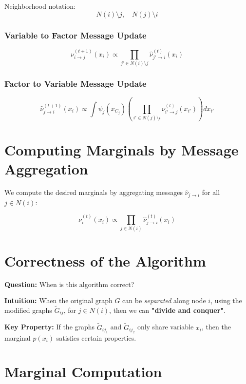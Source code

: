 \documentclass{article}%
\begin{document}
Neighborhood notation:
\[
N(i) \setminus j, \quad N(j) \setminus i
\]

\subsubsection*{Variable to Factor Message Update}
\[
\nu_{i \to j}^{(t+1)}(x_i) \propto \prod_{j' \in N(i) \setminus j} \hat{\nu}_{j' \to i}^{(t)}(x_i)
\]

\subsubsection*{Factor to Variable Message Update}
\[
\hat{\nu}_{j \to i}^{(t+1)}(x_i) \propto \int \psi_j(x_{C_j}) 
\left( \prod_{i' \in N(j) \setminus i} \nu_{i' \to j}^{(t)}(x_{i'}) \right) dx_{i'}
\]


\section*{Computing Marginals by Message Aggregation}

We compute the desired marginals by aggregating messages \( \hat{\nu}_{j \to i} \) for all \( j \in N(i) \):

\[
\nu_i^{(t)}(x_i) \propto \prod_{j \in N(i)} \hat{\nu}_{j \to i}^{(t)}(x_i)
\]

\section*{Correctness of the Algorithm}

\textbf{Question:} When is this algorithm correct?

\textbf{Intuition:} When the original graph \( G \) can be \textit{separated} along node \( i \), using the modified graphs \( \tilde{G}_{ij} \), for \( j \in N(i) \), then we can \textbf{"divide and conquer"}.


\textbf{Key Property:} If the graphs \( \tilde{G}_{ij_1} \) and \( \tilde{G}_{ij_2} \) only share variable \( x_i \), then the marginal \( p(x_i) \) satisfies certain properties.



\section*{Marginal Computation}
\end{document}
